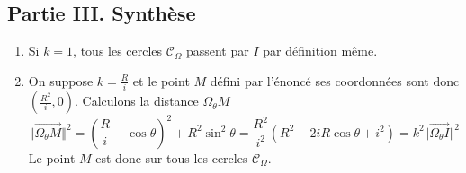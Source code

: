 \subsection*{Partie III. Synthèse}
\begin{enumerate}
 \item Si $k=1$, tous les cercles $\mathcal C_\Omega$ passent par $I$ par définition même.
 \item On suppose $k=\frac{R}{i}$ et le point $M$ défini par l'énoncé ses coordonnées sont donc $(\frac{R^2}{i},0)$. Calculons la distance $\Omega_\theta M$
\begin{displaymath}
 \Vert \overrightarrow{\Omega_\theta M}\Vert^2 = (\frac{R}{i}-\cos \theta)^2 + R^2\sin^2\theta 
= \frac{R^2}{i^2}\left( R^2 -2iR\cos \theta + i^2\right) 
=k^2  \Vert \overrightarrow{\Omega_\theta I}\Vert^2
\end{displaymath}
Le point $M$ est donc sur tous les cercles $\mathcal{C}_\Omega$.
\end{enumerate}
